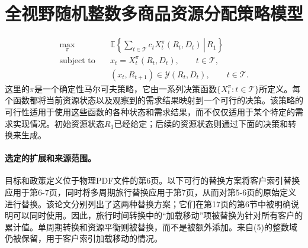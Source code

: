 \documentclass{article}
\begin{document}
\section*{全视野随机整数多商品资源分配策略模型}

\begin{align*}
\max_{\pi}\quad &\mathbb{E}\left\{\left.\sum_{t\in\mathcal{T}}c_tX_t^{\pi}(R_t,D_t)\,\right|\,R_1\right\}\\
\text{subject to}\quad
&x_t=X_t^{\pi}(R_t,D_t),\qquad t\in\mathcal{T},\\
&(x_t,R_{t+1})\in\mathcal{Y}(R_t,D_t),\qquad t\in\mathcal{T}.
\end{align*}
这里的\(\pi\)是一个确定性马尔可夫策略，它由一系列决策函数\(\{X_t^{\pi}:t\in\mathcal{T}\}\)所定义。每个函数都将当前资源状态以及观察到的需求结果映射到一个可行的决策。该策略的可行性适用于使用这些函数的各种状态和需求结果，而不仅仅适用于某个特定的需求实现情况。初始资源状态\(R_1\)已经给定；后续的资源状态则通过下面的决策和转换来生成。

\paragraph{选定的扩展和来源范围。}
目标和政策定义位于物理PDF文件的第6页。以下可行的替换方案将客户索引替换应用于第6-7页，同时将多周期旅行替换应用于第7页，从而对第5-6页的原始定义进行替换。该论文分别列出了这两种替换方案；它们在第17页的第6节中被明确说明可以同时使用。因此，旅行时间转换中的“加载移动”项被替换为针对所有客户的累计值。单周期转换和资源平衡则被替换，而不是被额外添加。来自(5)的整数域仍被保留，用于客户索引加载移动的情况。
\end{document}
